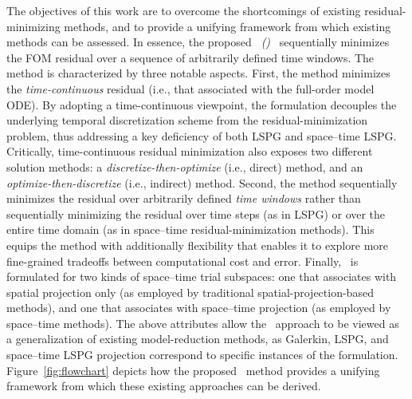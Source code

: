 \documentclass[3p,computermodern,10pt]{elsarticle}
\begin{document}
The objectives of this work are to overcome the shortcomings of existing
residual-minimizing methods, and to provide a unifying framework from which
existing methods can be assessed. In essence, the proposed \textit{\methodNameLower\
(\methodAcronym)} \approachKwd\ sequentially minimizes the FOM
residual over a sequence of arbitrarily defined
time windows. The method is characterized by three notable aspects.  First, the method
minimizes the \textit{time-continuous}  residual (i.e., that associated with
the full-order model ODE). By adopting a time-continuous viewpoint, the
formulation decouples the underlying temporal discretization scheme from the
residual-minimization problem, thus addressing a key deficiency of both LSPG
and space--time LSPG. Critically, time-continuous residual minimization also exposes
two different solution methods:  a \textit{discretize-then-optimize}
(i.e., direct) method, and an \textit{optimize-then-discretize} (i.e.,
indirect) method. Second, the method sequentially minimizes
the residual over arbitrarily defined \textit{time windows} rather than
sequentially minimizing the residual over time steps (as in LSPG)
or over the entire time domain (as in space--time residual-minimization
methods). This equips the method with additionally flexibility that enables it
to explore more fine-grained tradeoffs between computational cost and error.
Finally, \methodAcronym\ is formulated for two kinds of space--time trial
subspaces: one that associates with spatial projection only (as employed by traditional spatial-projection-based methods), and one that associates with space--time projection (as employed by space--time methods).
The above attributes allow the \methodAcronym\ approach to be viewed as a
generalization of existing model-reduction methods, as 
Galerkin, LSPG, and space--time LSPG projection correspond to specific
instances of the formulation.
Figure~\ref{fig:flowchart} depicts how the proposed \methodAcronym\ method
provides a unifying framework from which these existing approaches can be derived.
\end{document}
